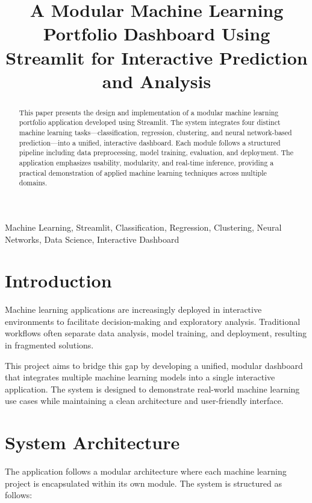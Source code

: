 \documentclass[conference]{IEEEtran}
\title{A Modular Machine Learning Portfolio Dashboard Using Streamlit for Interactive Prediction and Analysis}
\author{
\IEEEauthorblockN{Karim Guida}
\IEEEauthorblockA{
Ottawa, Canada \\
Email: guida.karim@gmail.com
}
}
\begin{document}
\maketitle

\begin{abstract}
This paper presents the design and implementation of a modular machine learning portfolio application developed using Streamlit. The system integrates four distinct machine learning tasks—classification, regression, clustering, and neural network-based prediction—into a unified, interactive dashboard. Each module follows a structured pipeline including data preprocessing, model training, evaluation, and deployment. The application emphasizes usability, modularity, and real-time inference, providing a practical demonstration of applied machine learning techniques across multiple domains.
\end{abstract}

\begin{IEEEkeywords}
Machine Learning, Streamlit, Classification, Regression, Clustering, Neural Networks, Data Science, Interactive Dashboard
\end{IEEEkeywords}

\section{Introduction}

Machine learning applications are increasingly deployed in interactive environments to facilitate decision-making and exploratory analysis. Traditional workflows often separate data analysis, model training, and deployment, resulting in fragmented solutions.

This project aims to bridge this gap by developing a unified, modular dashboard that integrates multiple machine learning models into a single interactive application. The system is designed to demonstrate real-world machine learning use cases while maintaining a clean architecture and user-friendly interface.

\section{System Architecture}

The application follows a modular architecture where each machine learning project is encapsulated within its own module. The system is structured as follows:
\end{document}
